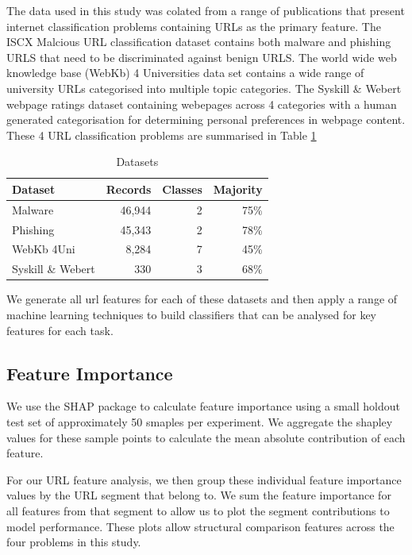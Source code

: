 \documentclass[sigconf]{acmart}
\begin{document}
The data used in this study was colated from a range of publications that 
present internet classification problems containing URLs as the primary feature.
The ISCX Malcious URL classification dataset contains both malware and phishing URLS 
that need to be discriminated against benign URLS\cite{Mamun2016}.
The world wide web knowledge base (WebKb) 4 Universities data set contains a wide
range of university URLs categorised into multiple topic categories\cite{Craven1998}.
The Syskill \& Webert webpage ratings dataset containing webepages across 4 categories
with a human generated categorisation for determining personal preferences in webpage
content\cite{Pazzani1996}. These 4 URL classification problems are summarised in Table \ref{tab:data}

\begin{table}
\caption{Datasets}
\label{tab:data}
\begin{tabular}{|l|r|r|r|}
\toprule
Dataset              &Records        &Classes  &Majority    \\
\midrule
Malware              &46,944          &2       &75\%        \\
Phishing             &45,343          &2       &78\%        \\
WebKb 4Uni           &8,284           &7       &45\%        \\
Syskill \& Webert    &330             &3       &68\%        \\
\bottomrule
\end{tabular}
\end{table}

We generate all url features for each of these datasets and then apply a range of machine learning
techniques to build classifiers that can be analysed for key features for each task.

\subsection{Feature Importance}

We use the SHAP\cite{Lundberg2017} package to calculate feature importance using a small holdout test set 
of approximately 50 smaples per experiment. We aggregate the shapley values for these sample points to calculate the mean
absolute contribution of each feature.

For our URL feature analysis, we then group these individual feature importance values by the URL segment
that belong to. We sum the feature importance for all features from that segment to allow us to plot the
segment contributions to model performance. These plots allow structural comparison features across the 
four problems in this study.
\end{document}
